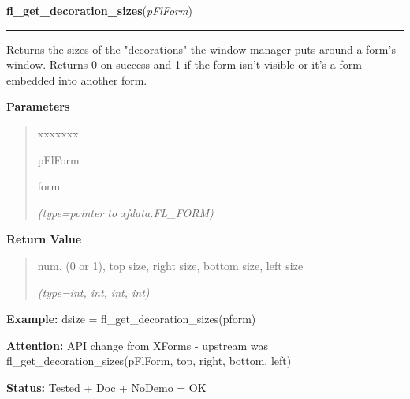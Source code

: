 \hspace{.8\funcindent}\begin{boxedminipage}{\funcwidth}

    \raggedright \textbf{fl\_get\_decoration\_sizes}(\textit{pFlForm})

    \vspace{-1.5ex}

    \rule{\textwidth}{0.5\fboxrule}
\setlength{\parskip}{2ex}
    Returns the sizes of the "decorations" the window manager puts around a
    form's window. Returns 0 on success and 1 if the form isn't visible or 
    it's a form embedded into another form.

\setlength{\parskip}{1ex}
      \textbf{Parameters}
      \vspace{-1ex}

      \begin{quote}
        \begin{Ventry}{xxxxxxx}

          \item[pFlForm]

          form

            {\it (type=pointer to xfdata.FL\_FORM)}

        \end{Ventry}

      \end{quote}

      \textbf{Return Value}
    \vspace{-1ex}

      \begin{quote}
      num. (0 or 1), top size, right size, bottom size, left size

      {\it (type=int, int, int, int)}

      \end{quote}

\textbf{Example:} dsize = fl\_get\_decoration\_sizes(pform)



\textbf{Attention:} API change from XForms - upstream was fl\_get\_decoration\_sizes(pFlForm, 
top, right, bottom, left)



\textbf{Status:} Tested + Doc + NoDemo = OK



    \end{boxedminipage}

    \label{xformslib:flxbasic:fl_raise_form}

